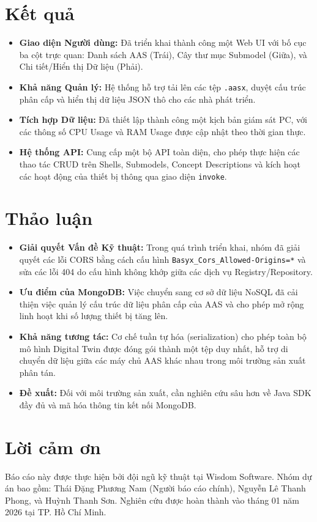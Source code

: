 \documentclass[twocolumn]{article}
\begin{document}
\section{Kết quả}
\begin{itemize}
    \item \textbf{Giao diện Người dùng:} Đã triển khai thành công một Web UI với bố cục ba cột trực quan: Danh sách AAS (Trái), Cây thư mục Submodel (Giữa), và Chi tiết/Hiển thị Dữ liệu (Phải).
    \item \textbf{Khả năng Quản lý:} Hệ thống hỗ trợ tải lên các tệp \texttt{.aasx}, duyệt cấu trúc phân cấp và hiển thị dữ liệu JSON thô cho các nhà phát triển.
    \item \textbf{Tích hợp Dữ liệu:} Đã thiết lập thành công một kịch bản giám sát PC, với các thông số CPU Usage và RAM Usage được cập nhật theo thời gian thực.
    \item \textbf{Hệ thống API:} Cung cấp một bộ API toàn diện, cho phép thực hiện các thao tác CRUD trên Shells, Submodels, Concept Descriptions và kích hoạt các hoạt động của thiết bị thông qua giao diện \texttt{invoke}.
\end{itemize}

\section{Thảo luận}
\begin{itemize}
    \item \textbf{Giải quyết Vấn đề Kỹ thuật:} Trong quá trình triển khai, nhóm đã giải quyết các lỗi CORS bằng cách cấu hình \texttt{Basyx\_Cors\_Allowed-Origins=*} và sửa các lỗi 404 do cấu hình không khớp giữa các dịch vụ Registry/Repository.
    \item \textbf{Ưu điểm của MongoDB:} Việc chuyển sang cơ sở dữ liệu NoSQL đã cải thiện việc quản lý cấu trúc dữ liệu phân cấp của AAS và cho phép mở rộng linh hoạt khi số lượng thiết bị tăng lên.
    \item \textbf{Khả năng tương tác:} Cơ chế tuần tự hóa (serialization) cho phép toàn bộ mô hình Digital Twin được đóng gói thành một tệp duy nhất, hỗ trợ di chuyển dữ liệu giữa các máy chủ AAS khác nhau trong môi trường sản xuất phân tán.
    \item \textbf{Đề xuất:} Đối với môi trường sản xuất, cần nghiên cứu sâu hơn về Java SDK đầy đủ và mã hóa thông tin kết nối MongoDB.
\end{itemize}

\section*{Lời cảm ơn}
Báo cáo này được thực hiện bởi đội ngũ kỹ thuật tại Wisdom Software. Nhóm dự án bao gồm: Thái Đặng Phương Nam (Người báo cáo chính), Nguyễn Lê Thanh Phong, và Huỳnh Thanh Sơn. Nghiên cứu được hoàn thành vào tháng 01 năm 2026 tại TP. Hồ Chí Minh.

\printbibliography
\end{document}
